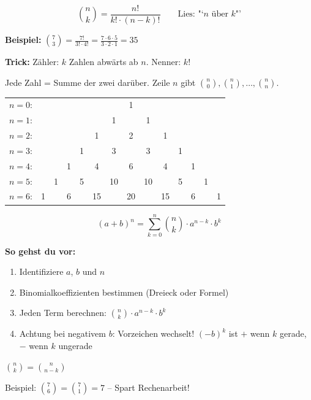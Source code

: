 \documentclass[10pt, a4paper]{article}
\begin{document}
\begin{defbox}[Binomialkoeffizient]
\[
    \binom{n}{k} = \frac{n!}{k! \cdot (n-k)!} \qquad \text{Lies: "`$n$ \"uber $k$"'}
\]

\textbf{Beispiel:} $\binom{7}{3} = \frac{7!}{3! \cdot 4!} = \frac{7 \cdot 6 \cdot 5}{3 \cdot 2 \cdot 1} = 35$

\textbf{Trick:} Z\"ahler: $k$ Zahlen abw\"arts ab $n$. Nenner: $k!$
\end{defbox}

\begin{defbox}
Jede Zahl = Summe der zwei dar\"uber. Zeile $n$ gibt $\binom{n}{0}, \binom{n}{1}, \ldots, \binom{n}{n}$.

\begin{center}
\begin{tabular}{rccccccccccccc}
    $n=0$: & & & & & & & 1 \\
    $n=1$: & & & & & & 1 & & 1 \\
    $n=2$: & & & & & 1 & & 2 & & 1 \\
    $n=3$: & & & & 1 & & 3 & & 3 & & 1 \\
    $n=4$: & & & 1 & & 4 & & 6 & & 4 & & 1 \\
    $n=5$: & & 1 & & 5 & & 10 & & 10 & & 5 & & 1 \\
    $n=6$: & 1 & & 6 & & 15 & & 20 & & 15 & & 6 & & 1
\end{tabular}
\end{center}
\end{defbox}

\begin{defbox}
\[
    (a + b)^n = \sum_{k=0}^{n} \binom{n}{k} \cdot a^{n-k} \cdot b^k
\]

\textbf{So gehst du vor:}
\begin{enumerate}
    \item Identifiziere $a$, $b$ und $n$
    \item Binomialkoeffizienten bestimmen (Dreieck oder Formel)
    \item Jeden Term berechnen: $\binom{n}{k} \cdot a^{n-k} \cdot b^k$
    \item Achtung bei negativem $b$: Vorzeichen wechselt! $(-b)^k$ ist $+$ wenn $k$ gerade, $-$ wenn $k$ ungerade
\end{enumerate}
\end{defbox}

\begin{tipbox}
$\binom{n}{k} = \binom{n}{n-k}$

Beispiel: $\binom{7}{6} = \binom{7}{1} = 7$ -- Spart Rechenarbeit!
\end{tipbox}
\end{document}
